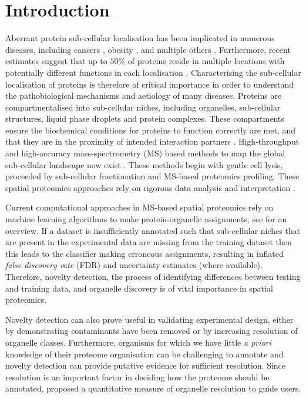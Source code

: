 \documentclass[12pt,english]{article}
\begin{document}
\section{Introduction}
Aberrant protein sub-cellular localisation has been implicated in numerous diseases, including cancers \citep{Kau:2004}, obesity \citep{Siljee:2018}, and multiple others \citep{Laurila:2009}. Furthermore, recent estimates suggest that up to $50\%$ of proteins reside in multiple locations with potentially different functions in each localisation \citep{hyper, Thul:2017}. Characterising the sub-cellular localisation of proteins is therefore of critical importance in order to understand the pathobiological mechanisms and aetiology of many diseases. Proteins are compartmentalised into sub-cellular niches, including organelles, sub-cellular structures, liquid phase droplets and protein complexes. These compartments ensure the biochemical conditions for proteins to function correctly are met, and that they are in the proximity of intended interaction partners \citep{Gibson:2009}. High-throughput and high-accuracy mass-spectrometry (MS) based methods to map the global sub-cellular landscape now exist \citep{hyper, Mulvey:2017, DC:2018, Orre:2019}. These methods begin with gentle cell lysis, proceeded by sub-cellular fractionation and MS-based proteomics profiling. These spatial proteomics approaches rely on rigorous data analysis and interpretation \citep{Gatto:2010, Gatto:2014b}.

Current computational approaches in MS-based spatial proteomics rely on machine learning algorithms to make protein-organelle assignments, see \citep{Gatto:2014b} for an overview. If a dataset is insufficiently annotated such that sub-cellular niches that are present in the experimental data are missing from the training dataset then this leads to the classifier making erroneous assignments, resulting in inflated \textit{false discovery rate} (FDR) and uncertainty estimates (where available). Therefore, novelty detection, the process of identifying differences between testing and training data, and organelle discovery is of vital importance in spatial proteomics.

Novelty detection can also prove useful in validating experimental design, either by demonstrating contaminants have been removed or by increasing resolution of organelle classes. Furthermore, organisms for which we have little \textit{a priori} knowledge of their proteome organisation can be challenging to annotate and novelty detection can provide putative evidence for sufficient resolution. Since resolution is an important factor in deciding how the proteome should be annotated, \cite{Gatto:2018} proposed a quantitative measure of organelle resolution to guide users.
\end{document}
